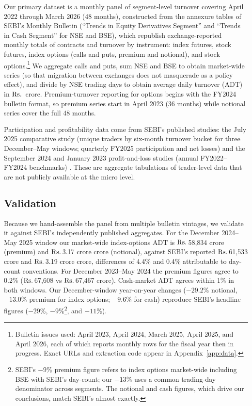 \documentclass[12pt]{article}
\newcommand{\rupee}{\text{Rs.}\,}
\begin{document}
Our primary dataset is a monthly panel of segment-level turnover covering
April 2022 through March 2026 (48 months), constructed from the annexure
tables of SEBI's Monthly Bulletin (``Trends in Equity Derivatives Segment''
and ``Trends in Cash Segment'' for NSE and BSE), which republish
exchange-reported monthly totals of contracts and turnover by instrument:
index futures, stock futures, index options (calls and puts, premium and
notional), and stock options.\footnote{Bulletin issues used: April 2023,
April 2024, March 2025, April 2025, and April 2026, each of which reports
monthly rows for the fiscal year then in progress. Exact URLs and extraction
code appear in Appendix~\ref{app:data}.} We aggregate calls and puts, sum
NSE and BSE to obtain market-wide series (so that migration between
exchanges does not masquerade as a policy effect), and divide by NSE trading
days to obtain average daily turnover (ADT) in \(\text{\rupee}\) crore.
Premium-turnover reporting for options begins with the FY2024 bulletin
format, so premium series start in April 2023 (36 months) while notional
series cover the full 48 months.

Participation and profitability data come from SEBI's published studies: the
July 2025 comparative study (unique traders by six-month turnover bucket for
three December--May windows; quarterly FY2025 participation and net losses)
and the September 2024 and January 2023 profit-and-loss studies (annual
FY2022--FY2024 benchmarks) \citep{sebi2023study,sebi2024study,
sebi2025comparative}. These are aggregate tabulations of trader-level data
that are not publicly available at the micro level.

\subsection{Validation}

Because we hand-assemble the panel from multiple bulletin vintages, we
validate it against SEBI's independently published aggregates. For the
December 2024--May 2025 window our market-wide index-options ADT is
\(\text{\rupee}\)58,834 crore (premium) and \(\text{\rupee}\)3.17 crore
crore (notional), against SEBI's reported \(\text{\rupee}\)61,533 crore and
\(\text{\rupee}\)3.19 crore crore, differences of 4.4\% and 0.4\%
attributable to day-count conventions. For December 2023--May 2024 the
premium figures agree to 0.2\% (\(\text{\rupee}\)67,608 vs
\(\text{\rupee}\)67,467 crore). Cash-market ADT agrees within 1\% in both
windows. Our December-window year-on-year changes ($-29.2\%$ notional,
$-13.0\%$ premium for index options; $-9.6\%$ for cash) reproduce SEBI's
headline figures ($-29\%$, $-9\%$\footnote{SEBI's $-9\%$ premium figure
refers to index options market-wide including BSE with SEBI's day-count;
our $-13\%$ uses a common trading-day denominator across segments. The
notional and cash figures, which drive our conclusions, match SEBI's almost
exactly.}, and $-11\%$).
\end{document}
